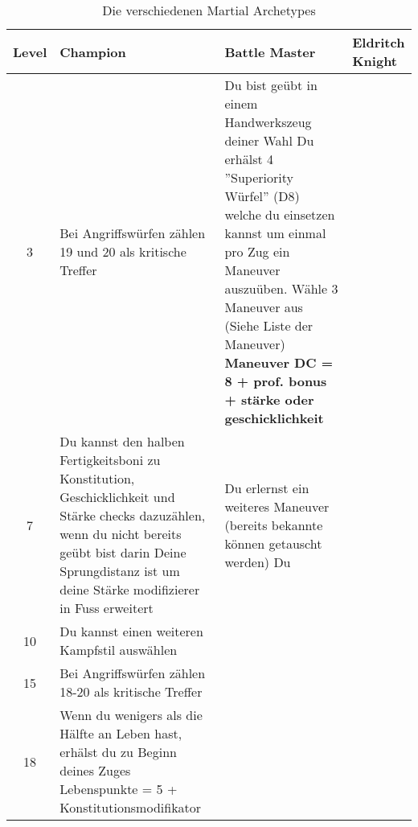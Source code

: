 \begin{table}
	\centering
	\begin{tabular}{cp{6cm}p{6cm}p{6cm}}
	\textbf{Level} & \textbf{Champion} & \textbf{Battle Master} & \textbf{Eldritch Knight}\\ \hline

	3 &
	Bei Angriffswürfen zählen 19 und 20 als kritische Treffer&
	Du bist geübt in einem Handwerkszeug deiner Wahl\linebreak
	Du erhälst 4 ''Superiority Würfel'' (D8) welche du einsetzen kannst um einmal pro Zug ein Maneuver auszuüben. Wähle 3 Maneuver aus (Siehe Liste der Maneuver) \linebreak
	\textbf{Maneuver DC =  8 + prof. bonus + stärke oder geschicklichkeit}&
	\\ \hline
	
	7 &
	Du kannst den halben Fertigkeitsboni zu Konstitution, Geschicklichkeit und Stärke checks dazuzählen, wenn du nicht bereits geübt bist darin\linebreak
	Deine Sprungdistanz ist um deine Stärke modifizierer in Fuss erweitert&
	Du erlernst ein weiteres Maneuver (bereits bekannte können getauscht werden)\linebreak
	Du &
	\\ \hline
	
	10 &
	Du kannst einen weiteren Kampfstil auswählen&
	&
	\\ \hline
	
	15 &
	Bei Angriffswürfen zählen 18-20 als kritische Treffer&
	&
	\\ \hline
	
	18 &
	Wenn du wenigers als die Hälfte an Leben hast, erhälst du zu Beginn deines Zuges Lebenspunkte = 5 + Konstitutionsmodifikator&
	&
	\\ \hline
	\end{tabular}
	\caption{Die verschiedenen Martial Archetypes}
\end{table}